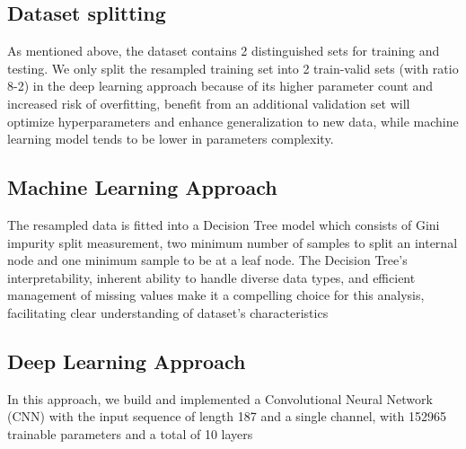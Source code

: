 \documentclass[]{acmsiggraph}
\begin{document}
\subsection{Dataset splitting}
As mentioned above, the dataset contains 2 distinguished sets for training and testing. 
We only split the resampled training set into 2 train-valid sets (with ratio 8-2) in the deep learning approach because of its higher parameter count and increased risk of overfitting, benefit from an additional validation set will optimize hyperparameters and enhance generalization to new data, while machine learning model tends to be lower in parameters complexity.

\subsection{Machine Learning Approach}
The resampled data is fitted into a Decision Tree model which consists of Gini impurity split measurement, two minimum number of samples to split an internal node and one minimum sample to be at a leaf node. The Decision Tree's interpretability, inherent ability to handle diverse data types, and efficient management of missing values make it a compelling choice for this analysis, facilitating clear understanding of dataset's characteristics

\subsection{Deep Learning Approach}
In this approach, we build and implemented a Convolutional Neural Network (CNN) with the input sequence of length 187 and a single channel, with 152965 trainable parameters and a total of 10 layers
\end{document}
